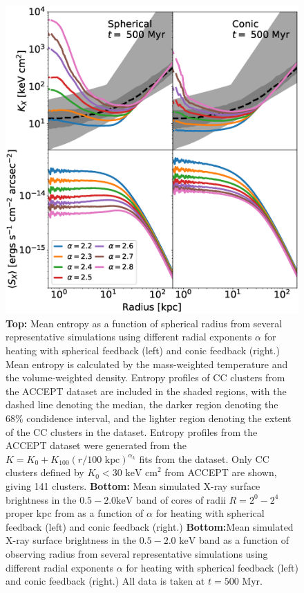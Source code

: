 \documentclass[iop,apjl, twocolappendix]{emulateapj}   %
\def\FG#1{{\textcolor{ForestGreen}{\textbf{\textit{ FG: #1}}}}}
\begin{document}
\begin{figure}
	\begin{center}
		\includegraphics[width=1\linewidth]{figures/allVradius.eps}
	\end{center}
	\caption{
    \label{fig:allVradius}
    \textbf{Top:} Mean entropy as a function of spherical radius from
    several representative simulations using different radial exponents
    $\alpha$ for heating with spherical feedback (left) and conic feedback
    (right.) Mean entropy is calculated by the mass-weighted temperature and the
    volume-weighted density. Entropy profiles
    of CC clusters from the ACCEPT dataset are included in the shaded regions,
    with the dashed line denoting the median, the darker region denoting the
    $68\%$ condidence interval, and the lighter region denoting the extent of
    the CC clusters in the dataset. Entropy profiles from the ACCEPT dataset
    were generated from the $K = K_0 + K_{100} \left ( r/100 \text{ kpc}
    \right )^{\alpha_k}$ fits from the dataset. Only CC clusters defined by $K_0
    < 30 \text{ keV cm}^2$ from ACCEPT are shown, giving 141 clusters.
    \textbf{Bottom:}	Mean simulated X-ray surface brightness in the $0.5 - 2.0
    \text{keV}$ band of cores of radii $R = 2^0 - 2^4$ proper kpc from as a
    function of $\alpha$ for heating with spherical feedback (left) and conic
    feedback (right.) 
    \textbf{Bottom:}Mean simulated X-ray surface brightness in the $0.5 -2.0
    \text{ keV}$ band as a function of observing radius from several
    representative simulations using different radial exponents $\alpha$ for
    heating with spherical feedback (left) and conic feedback (right.) All data
    is taken at $t= 500 \text{ Myr}$.
  }
\end{figure}
\end{document}
